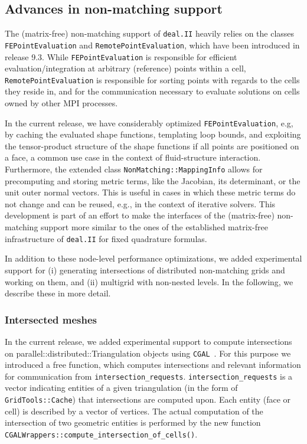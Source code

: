\documentclass{ansarticle-preprint}
\newcommand{\specialword}[1]{\texttt{#1}}
\newcommand{\dealii}{{\specialword{deal.II}}\xspace}
\begin{document}
\subsection{Advances in non-matching support}\label{sec:nonmatching}

The (matrix-free) non-matching support of \dealii heavily relies
on the classes \texttt{FE\-Point\-Eval\-u\-ation} and \texttt{RemotePointEvaluation},
which have been introduced in release 9.3. While \texttt{FE\-Point\-Eval\-u\-a\-tion}
is responsible for efficient evaluation/integration at arbitrary (reference)
points within a cell, \texttt{RemotePointEvaluation} is responsible for
sorting points with regards to the cells they reside in, and for the
communication necessary to evaluate solutions on cells owned by other
MPI processes.

In the current release, we have considerably optimized \texttt{FEPointEvaluation}, e.g,
by caching the evaluated shape functions, templating loop bounds, and
exploiting the tensor-product structure of the shape functions if all points are
positioned on a face, a common use case in the context of fluid-structure
interaction. Furthermore, the extended class \texttt{NonMatching::MappingInfo}
allows for precomputing and storing metric terms, like the Jacobian, its determinant,
or the unit outer normal vectors. This is useful in cases in which these metric terms do not change
and can be reused, e.g., in the context of iterative solvers. This development
is part of an effort to make the interfaces of the 
(matrix-free) non-matching support more similar to the ones of the 
established matrix-free infrastructure of \dealii for fixed quadrature formulas.

In addition to these node-level performance optimizations, we added experimental
support for (i) generating intersections of distributed
non-matching grids and working on them,
and (ii) multigrid with non-nested levels. In the following, we describe these
in more detail.

\subsubsection{Intersected meshes}
In the current release, we added experimental support to compute intersections on parallel::distributed::Triangulation objects using \texttt{CGAL}~\cite{cgal-user-ref}.
For this purpose we introduced a free function, which computes intersections and relevant information for communication from \texttt{intersection\_requests}.
\texttt{intersection\_requests} is a vector indicating entities of a given triangulation (in the form of \texttt{GridTools::Cache}) that intersections are computed upon.
Each entity (face or cell) is described by a vector of vertices. The actual computation of the intersection of two geometric
entities is performed by the new function \texttt{CGALWrappers::compute\_intersection\_of\_cells()}.
\end{document}

